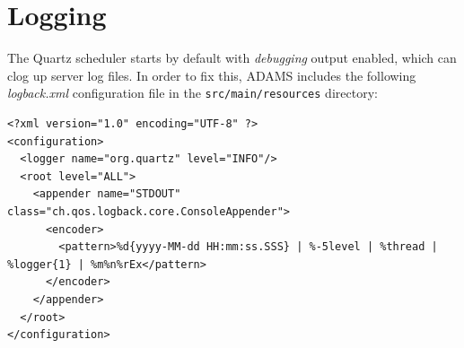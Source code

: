 \documentclass[a4paper]{book}
\begin{document}
\section{Logging}
The Quartz scheduler starts by default with \textit{debugging} output enabled,
which can clog up server log files. In order to fix this, ADAMS includes
the following \textit{logback.xml} configuration file in the \verb|src/main/resources|
directory:
\begin{verbatim}
<?xml version="1.0" encoding="UTF-8" ?>
<configuration>
  <logger name="org.quartz" level="INFO"/>
  <root level="ALL">
    <appender name="STDOUT" class="ch.qos.logback.core.ConsoleAppender">
      <encoder>
        <pattern>%d{yyyy-MM-dd HH:mm:ss.SSS} | %-5level | %thread | %logger{1} | %m%n%rEx</pattern>
      </encoder>
    </appender>
  </root>
</configuration>
\end{verbatim}


\end{document}
